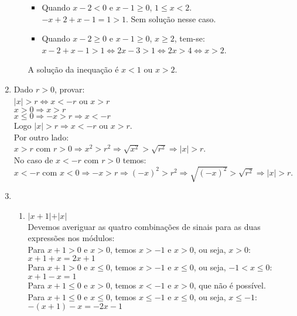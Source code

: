 \documentclass[10pt]{book}
\begin{document}
\begin{enumerate}
\begin{enumerate}
\begin{itemize}
		 \item
		 Quando $x - 2 < 0$ e $x -1 \geq 0$, $1 \leq x < 2$.\\
		 $-x + 2 + x -1 = 1 > 1$. Sem solução nesse caso.
		 \item
		 Quando $x - 2 \geq 0$ e $x - 1 \geq 0$, $x \geq 2$, tem-se:\\
		 $x-2+x-1>1 \Leftrightarrow 2x-3 > 1 \Leftrightarrow 2x > 4 \Leftrightarrow x > 2$.
		 \end{itemize}
 		 A solução da inequação é $x<1$ ou  $x>2$.
	\end{enumerate}
	\item 
		Dado $r > 0$, provar: \\
		$\vert x \vert > r \Leftrightarrow x < -r$ ou $x > r$\\
		$x > 0 \Rightarrow x > r$\\
		$x \leq 0 \Rightarrow -x > r \Rightarrow x < -r$\\
		Logo $\vert x \vert > r \Rightarrow x < -r$ ou $x > r$.\\
		Por outro lado:\\
		$x > r$ com $r > 0 \Rightarrow x^2 > r^2 \Rightarrow \sqrt{x^2} > \sqrt{r^2} \Rightarrow \vert x \vert > r$.\\
		No caso de $x < -r$ com $r > 0$ temos:\\
		$x < -r$ com $x < 0 \Rightarrow -x > r \Rightarrow (-x)^2 > r^2\Rightarrow \sqrt{(-x)^2} > \sqrt{r^2} \Rightarrow \vert x \vert > r$.
	\item %
		\begin{enumerate}
			\item %
			$\vert x + 1 \vert + \vert x \vert$\\
			Devemos averiguar as quatro combinações de sinais para as duas expressões nos módulos:\\
			Para $x + 1 > 0$ e $x > 0$, temos $x > -1$ e $x > 0$, ou seja, $x > 0$:\\
			$x + 1 + x = 2x + 1$\\
			Para $x + 1 > 0$ e $x \leq 0$, temos $x > -1$ e $x \leq 0$, ou seja, $-1 < x \leq 0$:\\
			$x + 1 - x = 1$\\
			Para $x + 1 \leq 0$ e $x > 0$, temos $x < -1$ e $x > 0$, que não é possível.\\
			Para $x + 1 \leq 0$ e $x \leq 0$, temos $x \leq -1$ e $x \leq 0$, ou seja, $x \leq -1$:\\		
			$-(x + 1) -x = -2x - 1$\\

\end{enumerate}
\end{enumerate}
\end{document}

